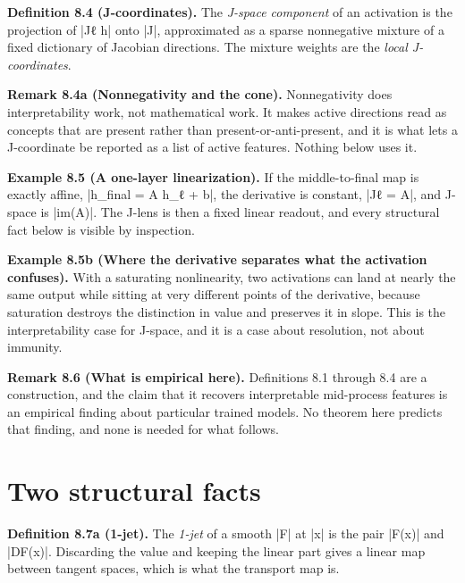 \documentclass{memoir}
\begin{document}
\textbf{Definition 8.4 (J-coordinates).} The \emph{J-space component} of an activation is the
projection of \LeanVerb|Jℓ h| onto \LeanVerb|J|, approximated as a sparse nonnegative mixture of a
fixed dictionary of Jacobian directions. The mixture weights are the \emph{local
J-coordinates}.

\textbf{Remark 8.4a (Nonnegativity and the cone).} Nonnegativity does interpretability work,
not mathematical work. It makes active directions read as concepts that are
present rather than present-or-anti-present, and it is what lets a J-coordinate
be reported as a list of active features. Nothing below uses it.

\textbf{Example 8.5 (A one-layer linearization).} If the middle-to-final map is exactly
affine, \LeanVerb|h_final = A h_ℓ + b|, the derivative is constant, \LeanVerb|Jℓ = A|, and J-space
is \LeanVerb|im(A)|. The J-lens is then a fixed linear readout, and every structural fact
below is visible by inspection.

\textbf{Example 8.5b (Where the derivative separates what the activation confuses).} With a
saturating nonlinearity, two activations can land at nearly the same output
while sitting at very different points of the derivative, because saturation
destroys the distinction in value and preserves it in slope. This is the
interpretability case for J-space, and it is a case about resolution, not about
immunity.

\textbf{Remark 8.6 (What is empirical here).} Definitions 8.1 through 8.4 are a
construction, and the claim that it recovers interpretable mid-process features
is an empirical finding about particular trained models. No theorem here
predicts that finding, and none is needed for what follows.



\section{Two structural facts}\label{Two--Schemas--of--Impossibility-005F-005F-005F--Machine--Checked--Limits--of--Trustworthy--Machine--Learning-005F-005F-005F--and--Why--They--Tighten--with--Capability----J--Space-005F-005F-005F--and--Why--It--Does--Not--Escape----Two--structural--facts}

\textbf{Definition 8.7a (1-jet).} The \emph{1-jet} of a smooth \LeanVerb|F| at \LeanVerb|x| is the pair \LeanVerb|F(x)| and
\LeanVerb|DF(x)|. Discarding the value and keeping the linear part gives a linear map
between tangent spaces, which is what the transport map is.
\end{document}
